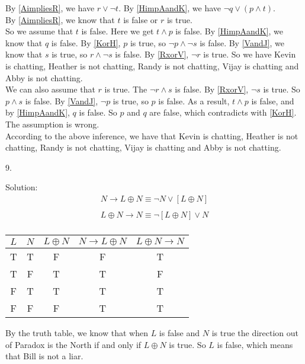 \documentclass[12pt]{article}
\begin{document}
By \ref{AimpliesR}, we have $r \lor \lnot t$. By \ref{HimpAandK}, we have $\lnot q \lor (p \land t)$.\\
\indent By \ref{AimpliesR}, we know that $t$ is false or $r$ is true. \\ 
\indent So we assume that $t$ is false. Here we get $t \land p$ is false. By \ref{HimpAandK}, we know that $q$ is false. By \ref{KorH}, $p$ is true, so $\lnot p \land \lnot s$ is false. By \ref{VandJ}, we know that $s$ is true, so $r \land \lnot s$ is false. By \ref{RxorV}, $\lnot r$ is true. So we have Kevin is chatting, Heather is not chatting, Randy is not chatting, Vijay is chatting and Abby is not chatting.\\ 
\indent We can also assume that $r$ is true. The $\lnot r \land s$ is false. By \ref{RxorV}, $\lnot s$ is true. So $p \land s$ is false. By \ref{VandJ}, $\lnot p$ is true, so $p$ is false. As a result, $t \land p$ is false, and by \ref{HimpAandK}, $q$ is false. So $p$ and $q$ are false, which contradicts with \ref{KorH}. The assumption is wrong.\\
\indent According to the above inference, we have that Kevin is chatting, Heather is not chatting, Randy is not chatting, Vijay is chatting and Abby is not chatting.
\newline

9. 

\indent Solution:\\
\begin{align*}
N \to L \oplus N \equiv \lnot N \lor [L \oplus N]\\ 
\end{align*}
\begin{align*}
L \oplus N \to N \equiv \lnot [L \oplus N] \lor N \\
\end{align*}

\begin{center}
\begin{tabular}{c|c|c|c|c}
    $L$ & $N$ & $L \oplus N$ & $N \to L \oplus N$ & $L \oplus N \to N$ \\
\hline
T & T & F & F & T \\
T & F & T & T & F \\
F & T & T & T & T \\
F & F & F & T & T
\end{tabular}
\end{center}

By the truth table, we know that when $L$ is false and $N$ is true the direction out of Paradox is the North if and only if $L \oplus N$ is true. So $L$ is false, which means that Bill is not a liar.
\newline
\end{document}
